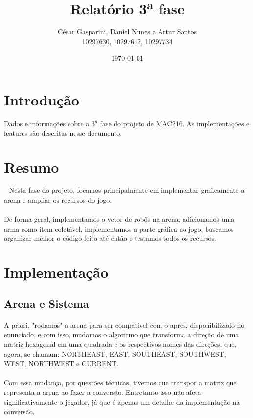\documentclass[a4paper]{article}
\title{\textbf{Relatório 3\textsuperscript{a} fase}}
\author{César Gasparini, Daniel Nunes e Artur Santos\\
 10297630, 10297612, 10297734}
\date{\today}
\begin{document}
\maketitle

\section*{Introdução}
Dados e informações sobre a $3^{a}$ fase do projeto de MAC216. As implementações e features são descritas nesse documento.

\section{Resumo}
 $\: \:$ Nesta fase do projeto, focamos principalmente em implementar graficamente a arena e ampliar os recursos do jogo.
\paragraph{}
De forma geral, implementamos o vetor de robôs na arena,  adicionamos uma arma como item coletável, implementamos a parte gráfica ao jogo, buscamos organizar melhor o código feito até então e testamos todos os recursos.

\section{Implementação}
  \subsection{Arena e Sistema}
  \paragraph{}
  A priori, "rodamos" a arena para ser compatível com o apres, disponibilizado no enunciado, e com isso, mudamos o algoritmo que transforma a direção de uma matriz hexagonal em uma quadrada e os respectivos nomes das direções, que, agora, se chamam: NORTHEAST,  EAST,  SOUTHEAST,  SOUTHWEST,  WEST,  NORTHWEST e  CURRENT. 
  \paragraph{}
  Com essa mudança, por questões técnicas, tivemos que transpor a matriz que representa a arena ao fazer a conversão. Entretanto isso não afeta significativamente o jogador, já que é apenas um detalhe da implementação na conversão. 
\end{document}

